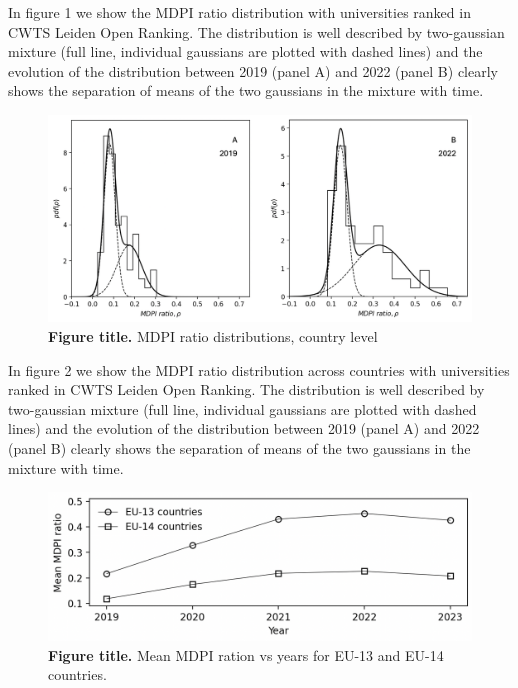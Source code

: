 \documentclass[amsfonts, amssymb, prl, superscriptaddress, notitlepage, twocolumn, nofootinbib]{revtex4-2}
\begin{document}
In figure 1 we show the MDPI ratio distribution with universities ranked in CWTS Leiden Open Ranking. The distribution is well described by two-gaussian mixture (full line, individual gaussians  are plotted with dashed lines) and the evolution of the distribution between 2019 (panel A) and 2022 (panel B) clearly shows the separation of means of the two gaussians in the mixture with time.  

\begin{figure}
    \centering
    \includegraphics[width=1.0\linewidth]{Fig02.png}
    \caption{\label{fig:fig2} {\bf Figure title.} MDPI ratio distributions, country level  
    }
\end{figure}

In figure 2 we show the MDPI ratio distribution across countries with universities ranked in CWTS Leiden Open Ranking. The distribution is well described by two-gaussian mixture (full line, individual gaussians  are plotted with dashed lines) and the evolution of the distribution between 2019 (panel A) and 2022 (panel B) clearly shows the separation of means of the two gaussians in the mixture with time.  

\begin{figure}
    \centering
    \includegraphics[width=1.0\linewidth]{Fig01a.png}
    \caption{\label{fig:fig3} {\bf Figure title.} Mean MDPI ration vs years for EU-13 and EU-14 countries.  
}
\end{figure}
\end{document}
